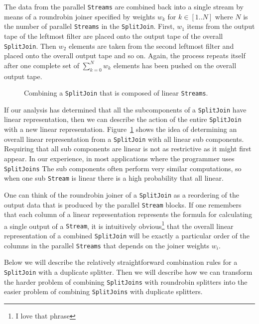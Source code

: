 The data from the parallel {\tt Streams} are combined back into a single stream by means of
a roundrobin joiner specified by weights $w_k$ for $k\in[1..N]$ where $N$ is the number
of parallel {\tt Streams} in the {\tt SplitJoin}. First, $w_1$ items from the output tape of the 
leftmost filter are placed onto the output tape of the overall {\tt SplitJoin}. 
Then $w_2$ elements are taken from the second leftmost filter and placed onto the 
overall output tape and so on. Again, the process repeats itself after one complete set
of $\sum_{k=0}^{N} w_k$ elements has been pushed on the overall output tape.

\begin{figure}
\center
\epsfxsize=3.0in
\caption{Combining a {\tt SplitJoin} that is composed of linear {\tt Streams}.}
\label{fig:splitjoin-combine}
\end{figure}

If our analysis has determined that all the subcomponents of a {\tt SplitJoin} 
have linear representation, then we can describe the action of the entire {\tt SplitJoin} 
with a new linear representation. Figure~\ref{fig:splitjoin-combine} shows the idea of
determining an overall linear representation from a {\tt SplitJoin} with all linear sub components.
Requiring that all sub components are linear is not as restrictive as it might first 
appear. In our experience, in most applications where the programmer uses {\tt SplitJoins}
The sub components often perform very similar computations, so when one sub {\tt Stream} 
is linear there is a high probability that all linear.

One can think of the roundrobin joiner of a {\tt SplitJoin} as a reordering of the output data 
that is produced by the parallel {\tt Stream} blocks. If one remembers that each column 
of a linear representation represents the formula for calculating a single output of a {\tt Stream}, 
it is intuitively obvious\footnote{I love that phrase} that the overall linear representation 
of a combined {\tt SplitJoin} will be exactly a particular order of the columns in the 
parallel {\tt Streams} that depends on the joiner weights $w_i$.

Below we will describe the relatively straightforward combination rules for a {\tt SplitJoin}
with a duplicate splitter. Then we will describe how we can transform the harder problem
of combining {\tt SplitJoins} with roundrobin splitters into the easier problem of combining
{\tt SplitJoins} with duplicate splitters. 


